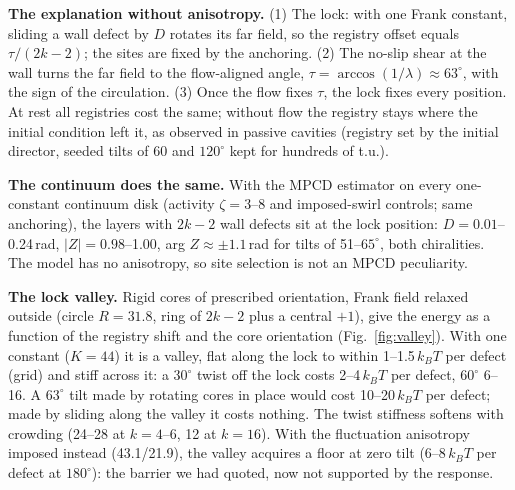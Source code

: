 \documentclass[11pt,a4paper]{article}
\newcommand{\kT}{k_BT}\newcommand{\half}{\tfrac12}\newcommand{\la}{\ell_a}
\begin{document}
\textbf{The explanation without anisotropy.} (1) The lock: with one Frank constant, sliding a wall defect by $D$ rotates its far field, so the
registry offset equals $\tau/(2k-2)$; the sites are fixed by the anchoring. (2) The no-slip shear at the wall turns the far field to the
flow-aligned angle, $\tau=\arccos(1/\lambda)\approx63^\circ$, with the sign of the circulation. (3) Once the flow fixes $\tau$, the lock fixes every
position. At rest all registries cost the same; without flow the registry stays where the initial condition left it, as observed in passive
cavities (registry set by the initial director, seeded tilts of 60 and $120^\circ$ kept for hundreds of t.u.).

\textbf{The continuum does the same.} With the MPCD estimator on every one-constant continuum disk (activity $\zeta=3$--8 and imposed-swirl
controls; same anchoring), the layers with $2k-2$ wall defects sit at the lock position: $D=0.01$--0.24\,rad, $|Z|=0.98$--1.00, arg
$Z\approx\pm1.1$\,rad for tilts of 51--$65^\circ$, both chiralities. The model has no anisotropy, so site selection is not an MPCD peculiarity.

\textbf{The lock valley.} Rigid cores of prescribed orientation, Frank field relaxed outside (circle $R=31.8$, ring of $2k-2$ plus a central
$+1$), give the energy as a function of the registry shift and the core orientation (Fig.~\ref{fig:valley}). With one constant ($K=44$) it is a
valley, flat along the lock to within 1--1.5\,$\kT$ per defect (grid) and stiff across it: a $30^\circ$ twist off the lock costs 2--4\,$\kT$ per
defect, $60^\circ$ 6--16. A $63^\circ$ tilt made by rotating cores in place would cost 10--20\,$\kT$ per defect; made by sliding along the valley it
costs nothing. The twist stiffness softens with crowding (24--28 at $k=4$--6, 12 at $k=16$). With the fluctuation anisotropy imposed instead
(43.1/21.9), the valley acquires a floor at zero tilt (6--8\,$\kT$ per defect at $180^\circ$): the barrier we had quoted, now not supported by the
response.
\end{document}
